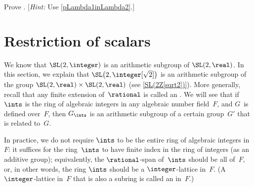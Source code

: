 \begin{exercises}
\item \label{GLambdaUnique}
 Prove . [{\it Hint:}
Use \cref{pLambda1inLambda2}.]



\end{exercises}






\section{Restriction of scalars} \label{RestrictScalarsSect}

We know that $\SL(2,\integer)$ is an arithmetic subgroup of
$\SL(2,\real)$. In this section, we explain that $\SL \bigl(
2, \integer[\sqrt{2}] \bigr)$ is an arithmetic subgroup of the group
$\SL(2,\real) \times \SL(2,\real)$ (see
\cref{SL(2Z[sqrt2])}). More generally, recall that any finite extension of~$\rational$
is called an . We will see that if
$\ints$ is the ring of algebraic integers in any
algebraic number field~$F$, and $G$~is defined over~$F$,
then $G_{\ints}$ is an arithmetic subgroup of a certain
group~$G'$ that is related to~$G$. 

\begin{rem}
 In practice, we do not require $\ints$ to be the
entire ring of algebraic integers in~$F$: it suffices for the ring~$\ints$ to have finite index in the ring of integers
(as an additive group); equivalently, the $\rational$-span
of~$\ints$ should be all of~$F$, or, in other words,
the ring $\ints$ should be a $\integer$-lattice
in~$F$. (A $\integer$-lattice in~$F$ that is also a
subring is called an  in~$F$.)
 \end{rem}

